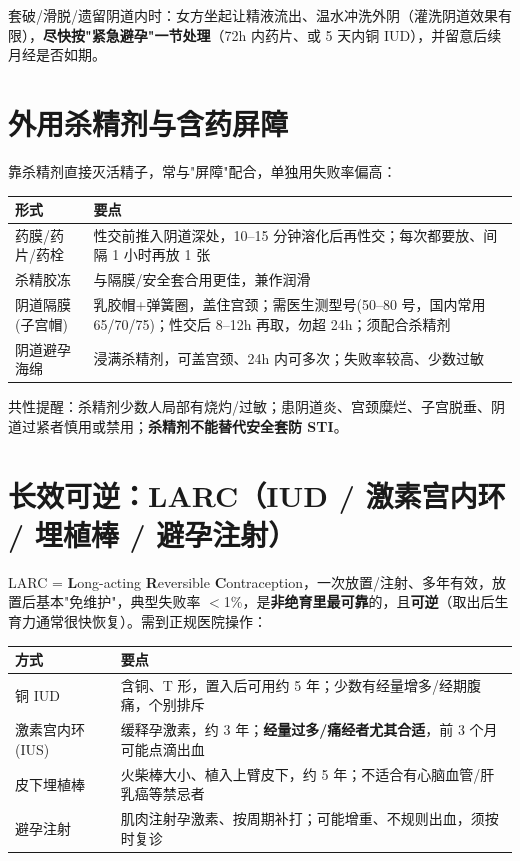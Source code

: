 \documentclass[12pt,UTF8,openany]{ctexbook}
\begin{document}
套破/滑脱/遗留阴道内时：女方坐起让精液流出、温水冲洗外阴（灌洗阴道效果有限），\textbf{尽快按"紧急避孕"一节处理}（72h 内药片、或 5 天内铜 IUD），并留意后续月经是否如期。

\section{外用杀精剂与含药屏障}

\noindent 靠杀精剂直接灭活精子，常与"屏障"配合，单独用失败率偏高：

\begin{tabularx}{\textwidth}{lX}
\toprule
形式 & 要点 \\
\midrule
药膜/药片/药栓 & 性交前推入阴道深处，10--15 分钟溶化后再性交；每次都要放、间隔 1 小时再放 1 张 \\
杀精胶冻 & 与隔膜/安全套合用更佳，兼作润滑 \\
阴道隔膜(子宫帽) & 乳胶帽+弹簧圈，盖住宫颈；需医生测型号(50--80 号，国内常用 65/70/75)；性交后 8--12h 再取，勿超 24h；须配合杀精剂 \\
阴道避孕海绵 & 浸满杀精剂，可盖宫颈、24h 内可多次；失败率较高、少数过敏 \\
\bottomrule
\end{tabularx}

\noindent 共性提醒：杀精剂少数人局部有烧灼/过敏；患阴道炎、宫颈糜烂、子宫脱垂、阴道过紧者慎用或禁用；\textbf{杀精剂不能替代安全套防 STI}。

\section{长效可逆：LARC（IUD / 激素宫内环 / 埋植棒 / 避孕注射）}

\noindent LARC = \textbf{L}ong-acting \textbf{R}eversible \textbf{C}ontraception，一次放置/注射、多年有效，放置后基本"免维护"，典型失败率 $<$1\%，是\textbf{非绝育里最可靠}的，且\textbf{可逆}（取出后生育力通常很快恢复）。需到正规医院操作：

\begin{tabularx}{\textwidth}{lX}
\toprule
方式 & 要点 \\
\midrule
铜 IUD & 含铜、T 形，置入后可用约 5 年；少数有经量增多/经期腹痛，个别排斥 \\
激素宫内环(IUS) & 缓释孕激素，约 3 年；\textbf{经量过多/痛经者尤其合适}，前 3 个月可能点滴出血 \\
皮下埋植棒 & 火柴棒大小、植入上臂皮下，约 5 年；不适合有心脑血管/肝乳癌等禁忌者 \\
避孕注射 & 肌肉注射孕激素、按周期补打；可能增重、不规则出血，须按时复诊 \\
\bottomrule
\end{tabularx}
\end{document}
